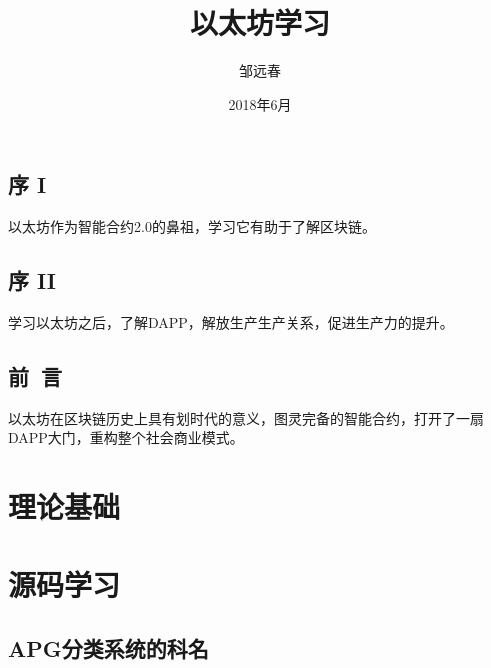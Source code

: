 \documentclass[utf8]{book}
\begin{document}
\title{\heiti 以太坊学习}
\author{\fangsong 邹远春}
\date{2018年6月}

\frontmatter
\maketitle

\chapter{序 I}

以太坊作为智能合约2.0的鼻祖，学习它有助于了解区块链。

\chapter{序 II}

学习以太坊之后，了解DAPP，解放生产生产关系，促进生产力的提升。

\chapter{前~言}

以太坊在区块链历史上具有划时代的意义，图灵完备的智能合约，打开了一扇DAPP大门，重构整个社会商业模式。

\renewcommand\contentsname{目~录}
\tableofcontents

\mainmatter

\part{理论基础}




\part{源码学习}






\appendix

\chapter{APG分类系统的科名}
\end{document}
